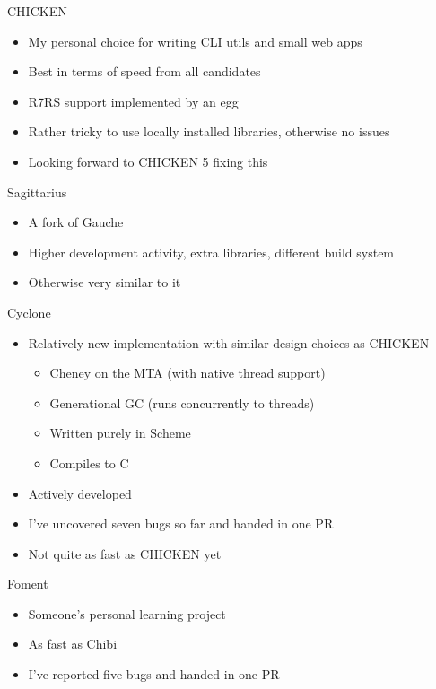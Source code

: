 \documentclass[presentation]{beamer}
\begin{document}
\begin{frame}[label=sec-3-8]{CHICKEN}
\begin{itemize}
\item My personal choice for writing CLI utils and small web apps
\item Best in terms of speed from all candidates
\item R7RS support implemented by an egg
\item Rather tricky to use locally installed libraries, otherwise no issues
\item Looking forward to CHICKEN 5 fixing this
\end{itemize}
\end{frame}

\begin{frame}[label=sec-3-9]{Sagittarius}
\begin{itemize}
\item A fork of Gauche
\item Higher development activity, extra libraries, different build system
\item Otherwise very similar to it
\end{itemize}
\end{frame}

\begin{frame}[label=sec-3-10]{Cyclone}
\begin{itemize}
\item Relatively new implementation with similar design choices as CHICKEN
\begin{itemize}
\item Cheney on the MTA (with native thread support)
\item Generational GC (runs concurrently to threads)
\item Written purely in Scheme
\item Compiles to C
\end{itemize}
\item Actively developed
\item I've uncovered seven bugs so far and handed in one PR
\item Not quite as fast as CHICKEN yet
\end{itemize}
\end{frame}

\begin{frame}[label=sec-3-11]{Foment}
\begin{itemize}
\item Someone's personal learning project
\item As fast as Chibi
\item I've reported five bugs and handed in one PR
\end{itemize}
\end{frame}
\end{document}
